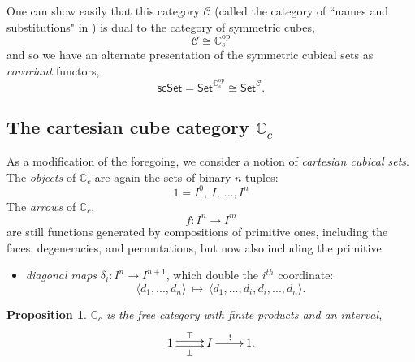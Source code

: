 \documentclass[11pt]{article}
\newcommand{\C}{\ensuremath{\mathbb{C}}}
\newcommand{\psh}[1]{\ensuremath{\mathsf{Set}^{#1^{\mathrm{op}}}}}
\newcommand{\covpsh}[1]{\ensuremath{\mathsf{Set}^{#1}}}
\newtheorem{proposition}[theorem]{Proposition}
\theoremstyle{remark}
\theoremstyle{definition}
\begin{document}
One can show easily that this category $\mathcal{C}$ (called the category of ``names and substitutions" in \cite{BCH}) is dual to the category of symmetric cubes, $$\mathcal{C} \cong \C^{\mathrm{op}}_s$$ and so 
we have an alternate presentation of the symmetric cubical sets as \emph{covariant} functors,
\[
\mathsf{scSet} = \psh{\C_s} \cong \covpsh{\mathcal{C}}.
\]


\subsection{The cartesian cube category $\mathbb{C}_c$}

As a modification of the foregoing, we consider a notion of \emph{cartesian cubical sets}.  
The \emph{objects} of  $\C_c$ are again the sets of binary $n$-tuples:
\[
1 = I^0,\ I,\ ..., I^n
\]
%
The \emph{arrows} of $\C_c$, $$f : I^n \to I^m$$ are still functions generated by compositions of primitive ones, including the faces,  degeneracies, and permutations, but now also including the primitive
\begin{itemize}
\item \emph{diagonal maps} $\delta_i : I^n \to I^{n+1}$, which double the $i^{th}$ coordinate: $$\langle d_1, ..., d_n\rangle\ \mapsto\ \langle d_1, ..., d_i, d_i,..., d_n\rangle.$$
\end{itemize}
%

\begin{proposition}
$\C_c$ is the free category with finite products and an interval,
\[
\xymatrix{
 1 {\ar@<-.5ex>[r]_{\bot} \ar@<.5ex>[r]^{\top}} & I \ar[r]^{!} & 1.
}
\]
\end{proposition}
\end{document}
